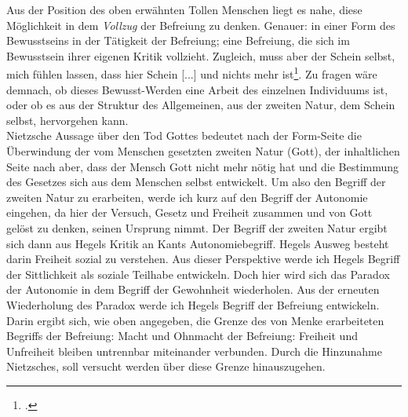 \documentclass[12pt, a4paper, openany]{report}
\begin{document}
Aus der Position des oben erwähnten \glqq Tollen Menschen\grqq{} liegt es nahe, diese Möglichkeit in dem \textit{Vollzug} der Befreiung zu denken. 
Genauer: in einer Form des Bewusstseins in der Tätigkeit der Befreiung; 
eine Befreiung, die sich im Bewusstsein ihrer eigenen Kritik vollzieht.
Zugleich, muss aber der Schein selbst, \glqq mich fühlen lassen, dass hier Schein [...] und nichts mehr ist\grqq\footcite[][417.]{nietzsche_morgenrote_1999}.
Zu fragen wäre demnach, ob dieses Bewusst-Werden eine Arbeit des einzelnen Individuums ist, oder ob es aus der Struktur des Allgemeinen, aus der zweiten Natur, dem Schein selbst, hervorgehen kann.\\

Nietzsche Aussage über den Tod Gottes bedeutet nach der Form-Seite die Überwindung der vom Menschen gesetzten zweiten Natur (Gott), der inhaltlichen Seite nach aber, dass der Mensch Gott nicht mehr nötig hat und die Bestimmung des Gesetzes sich aus dem Menschen selbst entwickelt. 
Um also den Begriff der zweiten Natur zu erarbeiten, werde ich kurz auf den Begriff der Autonomie eingehen, da hier der Versuch, Gesetz und Freiheit zusammen und von Gott gelöst zu denken, seinen Ursprung nimmt. 
Der Begriff der zweiten Natur ergibt sich dann aus Hegels Kritik an Kants Autonomiebegriff.
Hegels Ausweg besteht darin Freiheit sozial zu verstehen. 
Aus dieser Perspektive werde ich Hegels Begriff der Sittlichkeit als soziale Teilhabe entwickeln.
Doch hier wird sich das Paradox der Autonomie in dem Begriff der Gewohnheit wiederholen.
Aus der erneuten Wiederholung des Paradox werde ich Hegels Begriff der Befreiung entwickeln.
Darin ergibt sich, wie oben angegeben, die Grenze des von Menke erarbeiteten Begriffs der Befreiung:
Macht und Ohnmacht der Befreiung: Freiheit und Unfreiheit bleiben untrennbar miteinander verbunden.
Durch die Hinzunahme Nietzsches, soll versucht werden über diese Grenze hinauszugehen.\\
\end{document}
